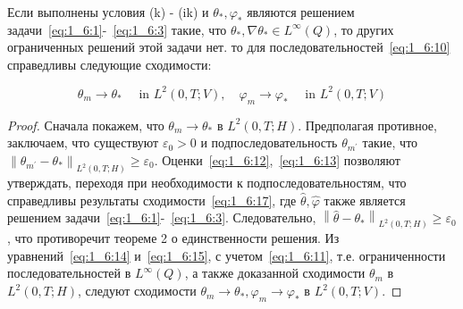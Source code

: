 \begin{theorem}
    \label{th:1_6:3}
    Если выполнены условия (k) - (ik) и $\theta_{*}, \varphi_{*}$ являются
    решением задачи~\eqref{eq:1_6:1}-~\eqref{eq:1_6:3}
    такие, что $\theta_{*}, \nabla \theta_{*} \in L^{\infty}(Q)$,
    то других ограниченных решений этой задачи нет.
    то для последовательностей~\eqref{eq:1_6:10} справедливы следующие сходимости:

    \[
        \theta_{m} \rightarrow \theta_{*} \quad \text { in } L^{2}(0, T ; V),
        \quad \varphi_{m} \rightarrow \varphi_{*} \quad \text { in } L^{2}(0, T ; V)
    \]
\end{theorem}
\begin{proof}
    Сначала покажем, что $\theta_{m} \rightarrow \theta_{*}$ в $L^{2}(0, T ; H)$.
    Предполагая противное, заключаем, что существуют $\varepsilon_{0}>0$ и подпоследовательность
    $\theta_{m^{\prime}}$ такие,
    что $\left\|\theta_{m^{\prime}}-\theta_{*}\right\|_{L^{2}(0, T ; H)} \geq \varepsilon_{0}$.
    Оценки~\eqref{eq:1_6:12},~\eqref{eq:1_6:13} позволяют утверждать,
    переходя при необходимости к подпоследовательностям,
    что справедливы результаты сходимости~\eqref{eq:1_6:17}, где $\widehat{\theta}, \widehat{\varphi}$
    также является решением задачи~\eqref{eq:1_6:1}-~\eqref{eq:1_6:3}.
    Следовательно, $\left\|\widehat{\theta}-\theta_{*}\right\|_{L^{2}(0, T ; H)} \geq \varepsilon_{0}$,
    что противоречит теореме 2 о единственности решения.
    Из уравнений~\eqref{eq:1_6:14} и~\eqref{eq:1_6:15}, с учетом~\eqref{eq:1_6:11},
    т.е. ограниченности последовательностей
    в $L^{\infty}(Q)$, а также доказанной
    сходимости $\theta_{m}$ в $L^{2}(0, T ; H)$,
    следуют сходимости $\theta_{m} \rightarrow \theta_{*},
    \varphi_{m} \rightarrow \varphi_ {*}$ в $L^{2}(0, T ; V)$.
\end{proof}
